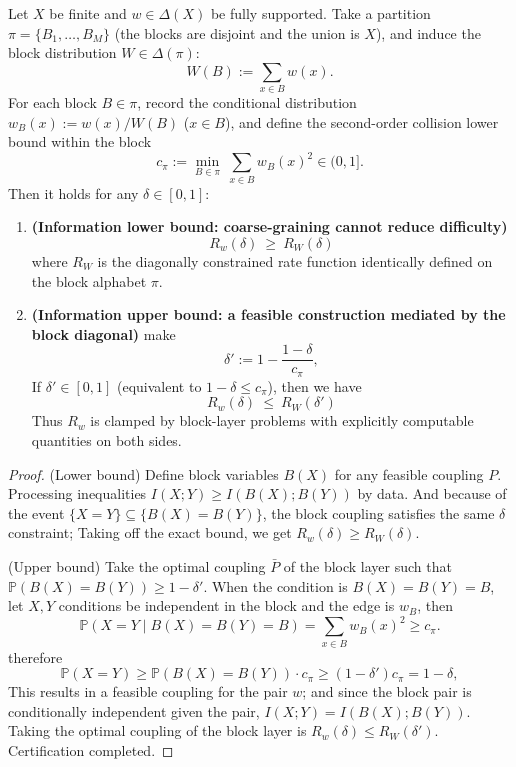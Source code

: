 \begin{theorem}\label{thm:pom-diagonal-rate-coarsegraining-bounds}
Let \(X\) be finite and \(w\in\Delta(X)\) be fully supported.
Take a partition \(\pi=\{B_1,\dots,B_M\}\) (the blocks are disjoint and the union is \(X\)), and induce the block distribution \(W\in\Delta(\pi)\):
\[
W(B):=\sum_{x\in B}w(x).
\]
For each block \(B\in\pi\), record the conditional distribution \(w_B(x):=w(x)/W(B)\) (\(x\in B\)), and define the second-order collision lower bound within the block
\[
c_\pi:=\min_{B\in\pi}\ \sum_{x\in B} w_B(x)^2\in(0,1].
\]
Then it holds for any \(\delta\in[0,1]\):
\begin{enumerate}
\item \textbf{(Information lower bound: coarse-graining cannot reduce difficulty)}
  \[
  \boxed{\;R_w(\delta)\ \ge\ R_W(\delta)\;}
  \]
where \(R_W\) is the diagonally constrained rate function identically defined on the block alphabet \(\pi\).

\item \textbf{(Information upper bound: a feasible construction mediated by the block diagonal)}
make
  \[
  \delta':=1-\frac{1-\delta}{c_\pi},
  \]
If \(\delta'\in[0,1]\) (equivalent to \(1-\delta\le c_\pi\)), then we have
  \[
  \boxed{\;R_w(\delta)\ \le\ R_W(\delta')\;}
  \]
Thus \(R_w\) is clamped by block-layer problems with explicitly computable quantities on both sides.
\end{enumerate}
\end{theorem}
\begin{proof}
(Lower bound) Define block variables \(B(X)\) for any feasible coupling \(P\).
Processing inequalities \(I(X;Y)\ge I(B(X);B(Y))\) by data.
And because of the event \(\{X=Y\}\subseteq\{B(X)=B(Y)\}\), the block coupling satisfies the same \(\delta\) constraint;
Taking off the exact bound, we get \(R_w(\delta)\ge R_W(\delta)\).
\par
(Upper bound) Take the optimal coupling \(\bar P\) of the block layer such that \(\mathbb P(B(X)=B(Y))\ge 1-\delta'\).
When the condition is \(B(X)=B(Y)=B\), let \(X,Y\) conditions be independent in the block and the edge is \(w_B\), then
\[
\mathbb P(X=Y\mid B(X)=B(Y)=B)=\sum_{x\in B}w_B(x)^2\ge c_\pi.
\]
therefore
\[
\mathbb P(X=Y)\ge \mathbb P(B(X)=B(Y))\cdot c_\pi\ge (1-\delta')c_\pi=1-\delta,
\]
This results in a feasible coupling for the pair \(w\); and since the block pair is conditionally independent given the pair, \(I(X;Y)=I(B(X);B(Y))\).
Taking the optimal coupling of the block layer is \(R_w(\delta)\le R_W(\delta')\). Certification completed.
\end{proof}

